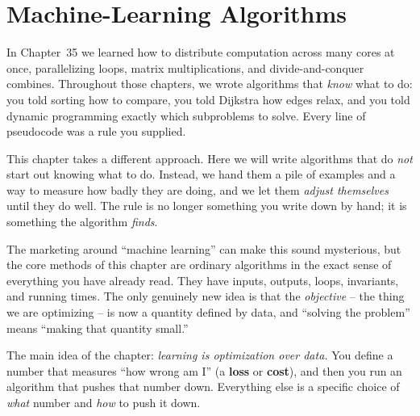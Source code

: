 \chapter{Machine-Learning Algorithms}
\label{ch36:ml}

In Chapter~35 we learned how to distribute computation across
many cores at once, parallelizing loops, matrix multiplications, and
divide-and-conquer combines. Throughout those chapters, we wrote algorithms that
\emph{know} what to do: you told sorting how to compare, you told Dijkstra how
edges relax, and you told dynamic programming exactly which subproblems to
solve. Every line of pseudocode was a rule you supplied.

This chapter takes a different approach. Here we will write algorithms that
do \emph{not} start out knowing what to do. Instead, we hand them a pile of
examples and a way to measure how badly they are doing, and we let them
\emph{adjust themselves} until they do well. The rule is no longer something
you write down by hand; it is something the algorithm \emph{finds}.

The marketing around ``machine learning'' can make this sound mysterious, but
the core methods of this chapter are ordinary algorithms in the exact sense of everything you
have already read. They have inputs, outputs, loops, invariants, and running
times. The only genuinely new idea is that the \emph{objective} -- the thing we
are optimizing -- is now a quantity defined by data, and ``solving the problem''
means ``making that quantity small.''

\begin{focusbox}
The main idea of the chapter:
\emph{learning is optimization over data.} You define a number that measures
``how wrong am I'' (a \textbf{loss} or \textbf{cost}), and then you run an
algorithm that pushes that number down. Everything else is a specific choice of
\emph{what} number and \emph{how} to push it down.
\end{focusbox}

